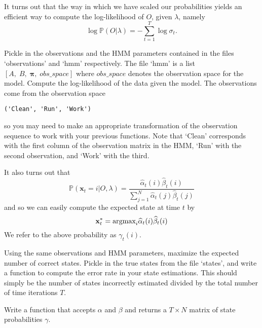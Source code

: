 It turns out that the way in which we have scaled our probabilities yields an efficient way to compute the log-likelihood of $O$, given $\lambda$, namely
$$\log \mathbb{P}(O | \lambda) = - \sum_{t=1}^{T} \log \sigma_{t}.$$

\begin{problem}
Pickle in the observations and the HMM parameters contained in the files `observations' and `hmm' respectively. The file `hmm' is a list $\left[ A, \; B, \; \mathbf{\pi}, \; obs\_space \right]$ where $obs\_space$ denotes the observation space for the model. Compute the log-likelihood of the data given the model. The observations come from the observation space
\begin{verbatim}
('Clean', 'Run', 'Work')
\end{verbatim}
so you may need to make an appropriate transformation of the observation sequence to work with your previous functions. Note that `Clean' corresponds with the first column of the observation matrix in the HMM, `Run' with the second observation, and `Work' with the third.
\end{problem}

It also turns out that 
\begin{equation*}
\mathbb{P}(\mathbf{x}_{t} = i | O, \lambda) = \frac{\widehat{\alpha}_{t}(i)\widehat{\beta}_{t}(i)}{\sum_{j=1}^{N} \widehat{\alpha}_{t}(j)\widehat{\beta}_{t}(j)}
\end{equation*}
and so we can easily compute the expected state at time $t$ by
\begin{equation*}
\mathbf{x}_{t}^{*} = \mbox{argmax}_{i} \widehat{\alpha}_{t}(i) \widehat{\beta}_{t}(i)
\end{equation*}
We refer to the above probability as $\gamma_{t}(i)$.

\begin{problem}
Using the same observations and HMM parameters, maximize the expected number of correct states. Pickle in the true states from the file `states', and write a function to compute the error rate in your state estimations. This should simply be the number of states incorrectly estimated divided by the total number of time iterations $T$.
\end{problem}

\begin{problem}
Write a function that accepts $\alpha$ and $\beta$ and returns a $T \times N$ matrix of state probabilities $\gamma$.
\end{problem}